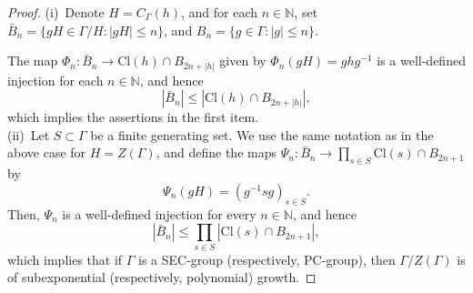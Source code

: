 \documentclass[10pt,a4paper]{amsart}
\newcommand{\G}{\Gamma}
\newcommand{\bN}{{\mathbb{N}}}
\begin{document}
\begin{proof}
(i)\ 
Denote $H=C_\G(h)$, and for each $n\in\mathbb{N}$, set $\bar{B}_n 
= \{gH\in\G/H: |gH| \le n\}$, and $B_n 
= \{g\in\Gamma: |g| \le n\}$. 

The map $\Phi_n: \bar{B}_n\to \text{Cl}(h)\cap B_{2n+|h|}$ given by
$
\Phi_n(gH) = ghg^{-1}
$
is a well-defined injection for each $n\in\mathbb{N}$, and hence 
\[
|\bar{B}_n|\leq |\text{Cl}(h)\cap B_{2n+|h|}| ,
\]
which implies the assertions in the first item. 
\\[1ex]
(ii)\
Let $S\subset \G$ be a finite generating set.
We use the same notation as in the above case for $H=Z(\G)$, and define 
the maps $\Psi_n: \bar{B}_n\to \prod_{s\in S}\text{Cl}(s)\cap B_{2n+1}$ by
\[
\Psi_n(gH) = (g^{-1}sg)_{s\in S} .
\]
Then, $\Psi_n$
is a well-defined injection for every $n\in\bN$, and hence 
\[
|\bar{B}_n|\leq \prod_{s\in S}|\text{Cl}(s)\cap B_{2n+1}| ,
\]
which implies that if $\G$ is a SEC-group (respectively, PC-group), then $\G/Z(\G)$ is of subexponential (respectively, polynomial) growth.
\end{proof}
\end{document}
